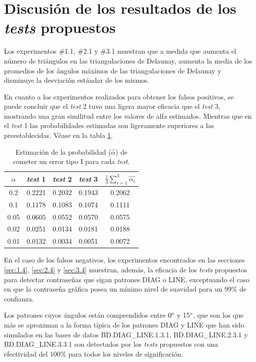 \documentclass[12pt]{report}
\begin{document}
\section{Discusión de los resultados de los \textit{tests} propuestos}
Los experimentos \#1.1, \#2.1 y \#3.1 muestran que a medida que aumenta el número de triángulos en las triangulaciones de Delaunay, aumenta la media de los promedios de los ángulos máximos de las triangulaciones de Delaunay y disminuye la desviación estándar de los mismos. 

En cuanto a los experimentos realizados para obtener los falsos positivos, se puede concluir que el \textit{test} 2 tuvo una ligera mayor eficacia que el \textit{test} 3, mostrando una gran similitud entre los valores de alfa estimados. Mientras que en el \textit{test} 1 las probabilidades estimadas son ligeramente superiores a las preestablecidas. Véase en la tabla \ref{tab:error1}.
\begin{table}[h!]
	\centering
	\caption{Estimación de la probabilidad ($\hat{\alpha}$) de cometer un error tipo I para cada \textit{test}.}
	\begin{tabular}{|c|ccc|c|}
		\hline
		$\alpha$& \textit{test} 1 & \textit{test} 2 & \textit{test} 3  & $\frac{1}{3} \sum_{i=1}^{3} \hat{\alpha_i}$  \\
		\hline
		0.2 &  0.2221    & 0.2032    &  0.1943 & 0.2062  \\
		0.1 &  0.1178    & 0.1083    &  0.1074 & 0.1111  \\
		0.05&  0.0605    & 0.0552    &  0.0570  & 0.0575  \\
		0.02&  0.0251    & 0.0134    &  0.0181 & 0.0188  \\
		0.01&  0.0132    & 0.0034    &  0.0051 & 0.0072  \\
		\hline
	\end{tabular}

	\label{tab:error1}
\end{table}

En el caso de los falsos negativos, los experimentos encontrados en las secciones \ref{sec:1.4}, \ref{sec:2.4} y \ref{sec:3.4} muestran, además, la eficacia de los \textit{tests} propuestos  para detectar contraseñas que sigan patrones DIAG o LINE, exceptuando el caso en que la contraseña gráfica posea un mínimo nivel de suavidad para un 99\% de confianza.

Los patrones cuyos ángulos están comprendidos entre $0\degree$ y 15$\degree$, que son los que más se aproximan a la forma típica de los patrones DIAG y LINE que han sido simulados en las bases de datos BD.DIAG\_LINE.1.3.1, BD.DIAG\_LINE.2.3.1 y BD.DIAG\_LINE.3.3.1 son detectados por los \textit{tests} propuestos con una efectividad del 100\% para todos los niveles de significación.
\end{document}
